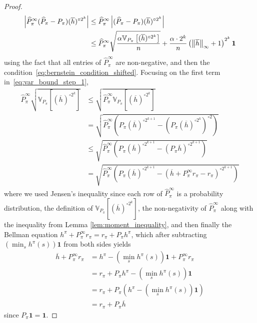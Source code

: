 \documentclass{article}
\theoremstyle{plain}
\theoremstyle{plain}
\theoremstyle{remark}
\theoremstyle{plain}
\theoremstyle{plain}
\newcommand{\Var}{\mathbb{V}}
\newcommand{\Phat}{\widehat{P}}
\newcommand{\one}{\mathbf{1}}
\newcommand{\hc}{\overline{h}}
\begin{document}
\begin{proof}
    \begin{align}
        \left|\Phat_\pi^\infty (\Phat_\pi - P_\pi) (\hc)^{\circ 2^k} \right| & \leq \Phat_\pi^\infty \left|(\Phat_\pi - P_\pi) (\hc)^{\circ 2^k} \right| \\
        & \leq \Phat_\pi^\infty  \sqrt{\frac{\alpha \Var_{P_\pi}\left[(\hc)^{\circ 2^k} \right] }{n}} + \frac{\alpha \cdot 2^k  }{n}\left(\infnorm{\hc} + 1 \right)^{2^k} \one \label{eq:var_bound_step_1}
    \end{align}
    using the fact that all entries of $\Phat_\pi^\infty$ are non-negative, and then the condition~\eqref{eq:bernstein_condition_shifted}. Focusing on the first term in~\eqref{eq:var_bound_step_1},
    \begin{align}
         \Phat_\pi^\infty  \sqrt{\Var_{P_\pi}\left[(\hc)^{\circ 2^k} \right]} &\leq  \sqrt{\Phat_\pi^\infty  \Var_{P_\pi}\left[(\hc)^{\circ 2^k} \right]} \\
         &= \sqrt{\Phat_\pi^\infty \left( P_\pi (\hc)^{\circ 2^{k+1}} - \left(P_\pi (\hc)^{\circ 2^k}\right)^{\circ 2} \right)} \\
         &\leq  \sqrt{\Phat_\pi^\infty \left( P_\pi (\hc)^{\circ 2^{k+1}} - \left(P_\pi \hc\right)^{\circ 2^{k+1}}  \right) } \\
         &=  \sqrt{\Phat_\pi^\infty \left( P_\pi (\hc)^{\circ 2^{k+1}} - \left( \hc + P_\pi^\infty r_\pi - r_\pi \right)^{\circ 2^{k+1}}  \right) } \label{eq:var_bound_step_2}
    \end{align}
    where we used Jensen's inequality since each row of $\Phat_\pi^\infty$ is a probability distribution, the definition of $\Var_{P_\pi}\left[(\hc)^{\circ 2^k} \right]$, the non-negativity of $\Phat_\pi^\infty$ along with the inequality from Lemma \ref{lem:moment_inequality}, and then finally the Bellman equation $h^\pi + P_\pi^\infty r_\pi = r_\pi + P_\pi h^\pi$, which after subtracting $\left(\min_s h^\pi(s) \right) \one$ from both sides yields
    \begin{align*}
        \hc + P_\pi^\infty r_\pi &= h^\pi - \left(\min_s h^\pi(s) \right) \one + P_\pi^\infty r_\pi \\
        &= r_\pi + P_\pi h^\pi - \left(\min_s h^\pi(s) \right) \one \\
        &= r_\pi + P_\pi \left( h^\pi - \left(\min_s h^\pi(s) \right) \one  \right) \\
        &= r_\pi + P_\pi \hc
    \end{align*}
    since $P_\pi \one = \one$.

\end{proof}
\end{document}
